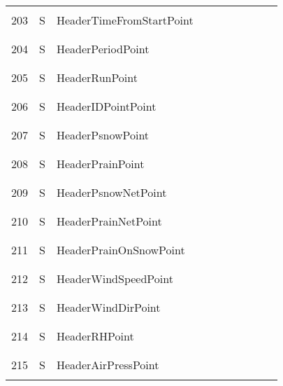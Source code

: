 \begin{longtable}{|c|c|l|c|c|c|c|p{}|c|p{}|}
&&&&&&&&&\\\hline%
&&&&&&&&&\\
203 & S & HeaderTimeFromStartPoint & & & & & & & \\
&&&&&&&&&\\\hline%
&&&&&&&&&\\
204 & S & HeaderPeriodPoint & & & & & & & \\
&&&&&&&&&\\\hline%
&&&&&&&&&\\
205 & S & HeaderRunPoint & & & & & & & \\
&&&&&&&&&\\\hline%
&&&&&&&&&\\
206 & S & HeaderIDPointPoint & & & & & & & \\
&&&&&&&&&\\\hline%
&&&&&&&&&\\
207 & S & HeaderPsnowPoint & & & & & & & \\
&&&&&&&&&\\\hline%
&&&&&&&&&\\
208 & S & HeaderPrainPoint & & & & & & & \\
&&&&&&&&&\\\hline%
&&&&&&&&&\\
209 & S & HeaderPsnowNetPoint & & & & & & & \\
&&&&&&&&&\\\hline%
&&&&&&&&&\\
210 & S & HeaderPrainNetPoint & & & & & & & \\
&&&&&&&&&\\\hline%
&&&&&&&&&\\
211 & S & HeaderPrainOnSnowPoint & & & & & & & \\
&&&&&&&&&\\\hline%
&&&&&&&&&\\
212 & S & HeaderWindSpeedPoint & & & & & & & \\
&&&&&&&&&\\\hline%
&&&&&&&&&\\
213 & S & HeaderWindDirPoint & & & & & & & \\
&&&&&&&&&\\\hline%
&&&&&&&&&\\
214 & S & HeaderRHPoint & & & & & & & \\
&&&&&&&&&\\\hline%
&&&&&&&&&\\
215 & S & HeaderAirPressPoint & & & & & & & \\
&&&&&&&&&\\\hline%

\end{longtable}
